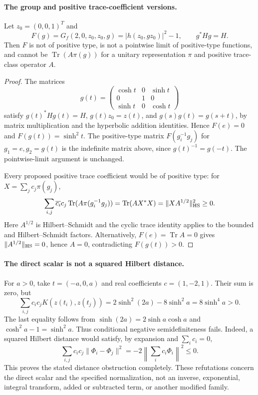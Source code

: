 \documentclass[11pt,a4paper]{article}
\newcommand{\Tr}{\operatorname{Tr}}
\begin{document}
\paragraph{The group and positive trace-coefficient versions.}
Let \(z_0=(0,0,1)^T\) and
\[
 F(g)=G_f(2,0,z_0,z_0,g)=|h(z_0,gz_0)|^2-1,\qquad g^*Hg=H.
\]
Then \(F\) is not of positive type, is not a pointwise limit of
positive-type functions, and cannot be \(\Tr(A\pi(g))\) for a unitary
representation \(\pi\) and positive trace-class operator \(A\).
\begin{proof}
The matrices
\[
 g(t)=\begin{pmatrix}
 \cosh t&0&\sinh t\\0&1&0\\\sinh t&0&\cosh t
 \end{pmatrix}
\]
satisfy \(g(t)^*Hg(t)=H\), \(g(t)z_0=z(t)\), and
\(g(s)g(t)=g(s+t)\), by matrix multiplication and the hyperbolic
addition identities. Hence \(F(e)=0\) and \(F(g(t))=\sinh^2t\).
The positive-type matrix \(F(g_i^{-1}g_j)\) for \(g_1=e,g_2=g(t)\)
is the indefinite matrix above, since \(g(t)^{-1}=g(-t)\).
The pointwise-limit argument is unchanged.

Every proposed positive trace coefficient would be of positive type:
for \(X=\sum_j c_j\pi(g_j)\),
\[
 \sum_{i,j}\overline{c_i}c_j\Tr(A\pi(g_i^{-1}g_j))
 =\Tr(AX^*X)=\|XA^{1/2}\|_{\rm HS}^2\ge0.
\]
Here \(A^{1/2}\) is Hilbert--Schmidt and the cyclic trace identity
applies to the bounded and Hilbert--Schmidt factors.
Alternatively, \(F(e)=\Tr A=0\) gives
\(\|A^{1/2}\|_{\rm HS}=0\), hence \(A=0\), contradicting
\(F(g(t))>0\).
\end{proof}

\paragraph{The direct scalar is not a squared Hilbert distance.}
For \(a>0\), take \(t=(-a,0,a)\) and real coefficients \(c=(1,-2,1)\).
Their sum is zero, but
\[
 \sum_{i,j}c_ic_jK(z(t_i),z(t_j))
 =2\sinh^2(2a)-8\sinh^2a=8\sinh^4a>0.
\]
The last equality follows from \(\sinh(2a)=2\sinh a\cosh a\) and
\(\cosh^2a-1=\sinh^2a\). Thus conditional negative semidefiniteness
fails. Indeed, a squared Hilbert distance would satisfy, by expansion
and \(\sum_i c_i=0\),
\[
 \sum_{i,j}c_ic_j\|\Phi_i-\Phi_j\|^2
 =-2\left\|\sum_i c_i\Phi_i\right\|^2\le0.
\]
This proves the stated distance obstruction completely. These
refutations concern the direct scalar and the specified normalization,
not an inverse, exponential, integral transform, added or subtracted
term, or another modified family.
\end{document}
